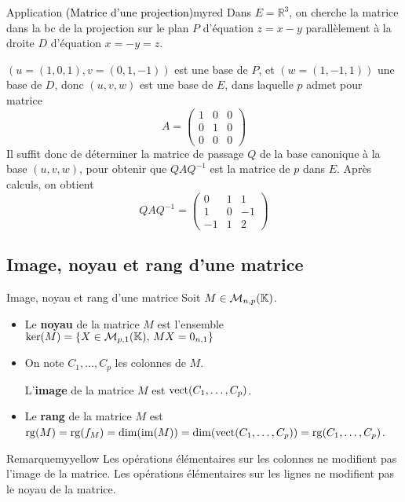     \begin{omed}{Application \textcolor{black}{(Matrice d’une projection)}}{myred}
        Dans $E = \mathbb{R}^3$, on cherche la matrice dans la bc de la projection sur le plan $P$ d’équation $z = x-y$ parallèlement à la droite $D$ d’équation $x = -y = z$.

        $(u = (1,0,1), v = (0,1,-1))$ est une base de $P$, et $(w = (1,-1,1))$ une base de $D$, donc $(u,v,w)$ est une base de $E$, dans laquelle $p$ admet pour matrice 
        \[ A = \left(\begin{array}{ccc}
            1&0&0\\
            0&1&0\\
            0&0&0
            \end{array}\right) \]
        Il suffit donc de déterminer la matrice de passage $Q$ de la base canonique à la base $(u,v,w)$, pour obtenir que $Q A Q^{-1}$ est la matrice de $p$ dans $E$. Après calculs, on obtient 
        \[ QAQ^{-1}=\left(
            \begin{array}{ccc}
            0&1&1\\
            1&0&-1\\
            -1&1&2
            \end{array}
            \right) \]   
    \end{omed}

\subsection{Image, noyau et rang d’une matrice}

    \begin{defi}{Image, noyau et rang d’une matrice}{}
        Soit $M \in \mathcal{M}_{n,p}(\mathbb{K})$.
        \begin{itemize}
            \item Le \textbf{noyau} de la matrice $M$ est l’ensemble $\ker(M)=\left\{ X \in \mathcal{M}_{p,1}(\mathbb{K}), \, MX=0_{n,1} \right\}$
            \item On note $C_1, \ldots, C_p$ les colonnes de $M$.

            L’\textbf{image} de la matrice $M$ est $\operatorname{vect}(C_1, \ldots, C_p)$.
            \item Le \textbf{rang} de la matrice $M$ est $\operatorname{rg}(M) = \operatorname{rg}(f_M)=\dim(\operatorname{im}(M)) = \dim(\operatorname{vect}(C_1,\ldots,C_p)) = \operatorname{rg}(C_1, \ldots, C_p)$. 
        \end{itemize}
    \end{defi}

    \begin{omed}{Remarque}{myyellow}
        Les opérations élémentaires sur les colonnes ne modifient pas l’image de la matrice.
        Les opérations élémentaires sur les lignes ne modifient pas le noyau de la matrice.
    \end{omed}

